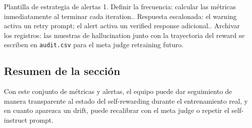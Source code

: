 \begin{knowledgebox}{Plantilla de estrategia de alertas}
1. Definir la frecuencia: calcular las métricas inmediatamente al terminar cada iteration.. Respuesta escalonada: el warning activa un retry prompt; el alert activa un verified response adicional.. Archivar los registros: las muestras de hallucination junto con la trayectoria del reward se escriben en \texttt{audit.csv} para el meta judge retraining futuro.
\end{knowledgebox}

\subsection{Resumen de la sección}
Con este conjunto de métricas y alertas, el equipo puede dar seguimiento de manera transparente al estado del self-rewarding durante el entrenamiento real, y en cuanto aparezca un drift, puede recalibrar con el meta judge o repetir el self-instruct prompt.
